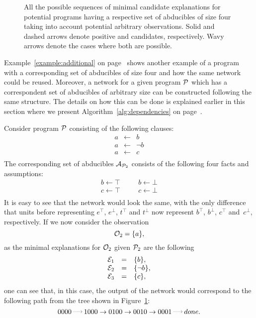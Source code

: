 \begin{figure}
\scalebox{0.5}{ \candidatestree }
\bigskip
\caption{All the possible sequences of minimal candidate explanations for potential programs having a respective set of abducibles of size four taking into account potential arbitrary observations. Solid and dashed arrows denote positive and candidates, respectively. Wavy arrows denote the cases where both are possible.}
\label{fig:exptree}
\end{figure}

Example~\ref{example:additional} on page~\pageref{example:additional} shows another example of a program with a corresponding set of abducibles of size four and how the same network could be reused. Moreover, a network for a given program $\mathcal{P}$ which has a correspondent set of abducibles of arbitrary size can be constructed following the same structure. The details on how this can be done is explained earlier in this section where we present Algorithm~\ref{alg:dependencies} on page~\pageref{alg:dependencies}.

\newpage
\vspace*{\fill}
\begin{tcolorbox}
\begin{example}
\label{example:additional}
\normalfont 
Consider program $\mathcal{P}$ consisting of the following clauses:
\[
\begin{array}{lcl}
a &\leftarrow& b \\
a &\leftarrow& \neg b \\
a &\leftarrow& c \\
\end{array}
\]
The corresponding set of abducibles $\mathcal{A}_{\mathcal{P}_2}$ consists of the following four facts and assumptions:
\[
\begin{array}{ccc}
b \leftarrow \top &\quad& b \leftarrow \bot \\
c \leftarrow \top &\quad& c \leftarrow \bot \\
\end{array}
\]
It is easy to see that the network would look the same, with the only difference that units before representing $e^\top$, $e^\bot$, $t^\top$ and $t^\bot$ now represent $b^\top$, $b^\bot$, $c^\top$ and~$c^\bot$, respectively. If we now consider the observation
\[
\mathcal{O}_2 = \{a\},
\]
as the minimal explanations for $\mathcal{O}_2$ given $\mathcal{P}_2$ are the following
\[
\begin{array}{lcl}
\mathcal{E}_1 &=& \{b\}, \\
\mathcal{E}_2 &=& \{\neg b\}, \\
\mathcal{E}_3 &=& \{c\},
\end{array}
\]
one can see that, in this case, the output of the network would correspond to the following path from the tree shown in Figure~\ref{fig:exptree}:
\[
0000 \DashedArrow[->,densely dotted] 1000 \rightarrow 0100 \rightarrow 0010 \rightarrow 0001 \DashedArrow[->,densely dotted] done.
\]
\end{example}
\end{tcolorbox}
\vspace*{\fill}
\newpage

